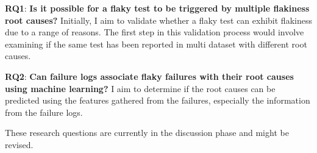 \begin{description}
    \item \textbf{RQ1}: \textbf{Is it possible for a flaky test to be triggered by multiple flakiness root causes?}\label{future1} Initially, I aim to validate whether a flaky test can exhibit flakiness due to a range of reasons. The first step in this validation process would involve examining if the same test has been reported in multi dataset with different root causes.
    \item \textbf{RQ2}: \textbf{Can failure logs associate flaky failures with their root causes using machine learning?}\label{future2} I aim to determine if the root causes can be predicted using the features gathered from the failures, especially the information from the failure logs.
\end{description}







These research questions are currently in the discussion phase and might be revised.  